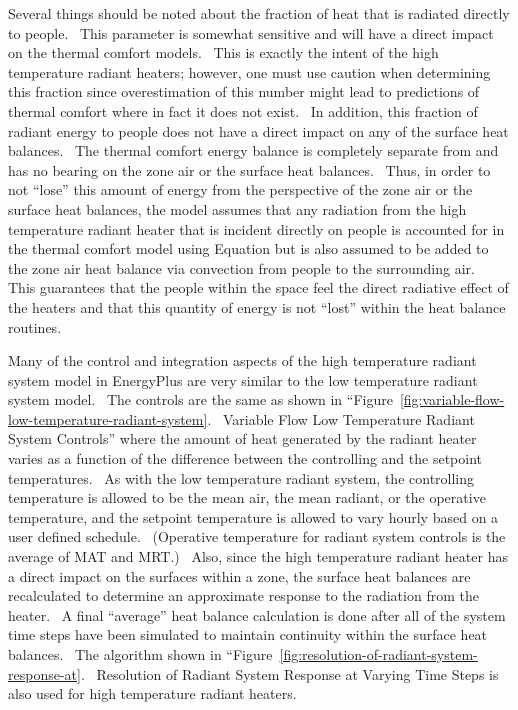 Several things should be noted about the fraction of heat that is radiated directly to people.~ This parameter is somewhat sensitive and will have a direct impact on the thermal comfort models.~ This is exactly the intent of the high temperature radiant heaters; however, one must use caution when determining this fraction since overestimation of this number might lead to predictions of thermal comfort where in fact it does not exist.~ In addition, this fraction of radiant energy to people does not have a direct impact on any of the surface heat balances.~ The thermal comfort energy balance is completely separate from and has no bearing on the zone air or the surface heat balances.~ Thus, in order to not ``lose'' this amount of energy from the perspective of the zone air or the surface heat balances, the model assumes that any radiation from the high temperature radiant heater that is incident directly on people is accounted for in the thermal comfort model using Equation but is also assumed to be added to the zone air heat balance via convection from people to the surrounding air.~ This guarantees that the people within the space feel the direct radiative effect of the heaters and that this quantity of energy is not ``lost'' within the heat balance routines.

Many of the control and integration aspects of the high temperature radiant system model in EnergyPlus are very similar to the low temperature radiant system model.~ The controls are the same as shown in ``Figure~\ref{fig:variable-flow-low-temperature-radiant-system}.~ Variable Flow Low Temperature Radiant System Controls'' where the amount of heat generated by the radiant heater varies as a function of the difference between the controlling and the setpoint temperatures.~ As with the low temperature radiant system, the controlling temperature is allowed to be the mean air, the mean radiant, or the operative temperature, and the setpoint temperature is allowed to vary hourly based on a user defined schedule.~ (Operative temperature for radiant system controls is the average of MAT and MRT.)~ Also, since the high temperature radiant heater has a direct impact on the surfaces within a zone, the surface heat balances are recalculated to determine an approximate response to the radiation from the heater.~ A final ``average'' heat balance calculation is done after all of the system time steps have been simulated to maintain continuity within the surface heat balances.~ The algorithm shown in ``Figure~\ref{fig:resolution-of-radiant-system-response-at}.~ Resolution of Radiant System Response at Varying Time Steps is also used for high temperature radiant heaters.


